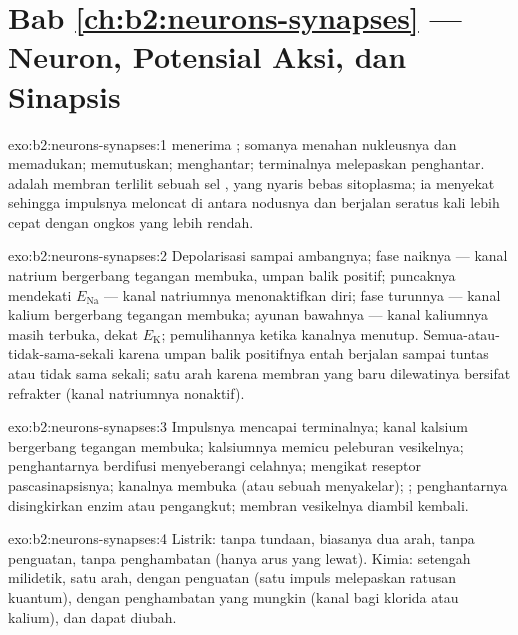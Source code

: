 \section*{Bab \ref{ch:b2:neurons-synapses} --- Neuron, Potensial Aksi, dan Sinapsis}

\begin{solution}{exo:b2:neurons-synapses:1}
 menerima ; somanya menahan nukleusnya dan
memadukan;  memutuskan;  menghantar;
terminalnya melepaskan penghantar.  adalah membran terlilit
sebuah sel , yang nyaris bebas sitoplasma; ia menyekat 
sehingga impulsnya meloncat di antara nodusnya dan berjalan seratus
kali lebih cepat dengan ongkos yang lebih rendah.
\end{solution}

\begin{solution}{exo:b2:neurons-synapses:2}
Depolarisasi sampai ambangnya; fase naiknya --- kanal natrium
bergerbang tegangan membuka, umpan balik positif; puncaknya mendekati
$E_{\mathrm{Na}}$ --- kanal natriumnya menonaktifkan diri; fase
turunnya --- kanal kalium bergerbang tegangan membuka; ayunan bawahnya
--- kanal kaliumnya masih terbuka, dekat $E_{\mathrm K}$; pemulihannya
ketika kanalnya menutup. Semua-atau-tidak-sama-sekali karena umpan
balik positifnya entah berjalan sampai tuntas atau tidak sama sekali;
satu arah karena membran yang baru dilewatinya bersifat refrakter
(kanal natriumnya nonaktif).
\end{solution}

\begin{solution}{exo:b2:neurons-synapses:3}
Impulsnya mencapai terminalnya; kanal kalsium bergerbang tegangan
membuka; kalsiumnya memicu peleburan vesikelnya; penghantarnya
berdifusi menyeberangi celahnya; mengikat reseptor pascasinapsisnya;
kanalnya membuka (atau sebuah  menyakelar); ; penghantarnya disingkirkan enzim atau pengangkut;
membran vesikelnya diambil kembali.
\end{solution}

\begin{solution}{exo:b2:neurons-synapses:4}
Listrik: tanpa tundaan, biasanya dua arah, tanpa penguatan, tanpa
penghambatan (hanya arus yang lewat). Kimia: setengah milidetik, satu
arah, dengan penguatan (satu impuls melepaskan ratusan kuantum), dengan
penghambatan yang mungkin (kanal bagi klorida atau kalium), dan dapat
diubah.
\end{solution}

